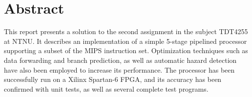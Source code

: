 \chapter*{Abstract}

\vspace*{\fill}

This report presents a solution to the second assignment in the subject TDT4255 at NTNU.
It describes an implementation of a simple 5-stage pipelined processor supporting a subset of the MIPS instruction set.
Optimization techniques such as data forwarding and branch prediction, as well as automatic hazard detection have also been employed to increase its performance.
The processor has been successfully run on a Xilinx Spartan-6 FPGA, and its accuracy has been confirmed with unit tests, as well as several complete test programs.

\vspace*{\fill}
